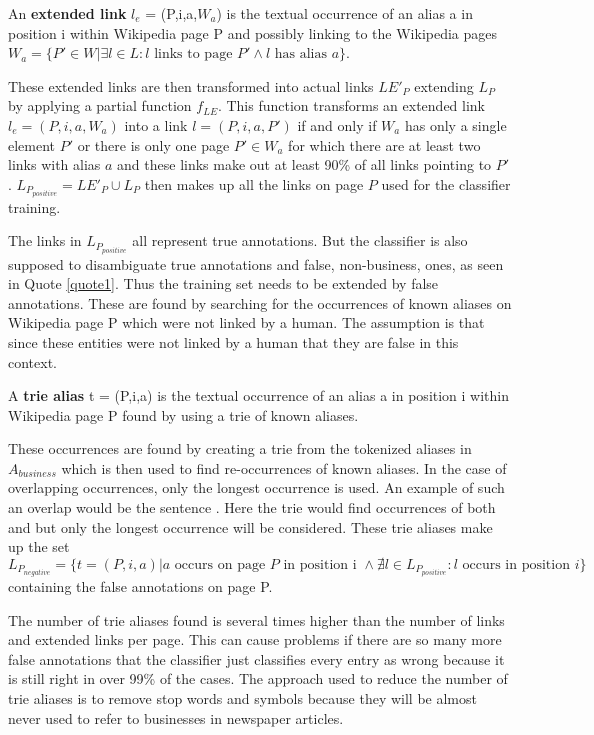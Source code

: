 \begin{definition}
An \textbf{extended link} $l_e$ = (P,i,a,$W_a$) is the textual occurrence of an alias a in position i within Wikipedia page P and possibly linking to the Wikipedia pages $W_a = \{ P' \in W | \exists l \in L: l \text{ links to page } P' \land l \text{ has alias } a \}$.
\label{extendedlink}
\end{definition}
These extended links are then transformed into actual links $LE'_P$ extending $L_P$ by applying a partial function $f_{LE}$.
This function transforms an extended link $l_e = (P,i,a,W_a)$ into a link $l = (P,i,a,P')$ if and only if $W_a$ has only a single element $P'$ or there is only one page $P' \in W_a$ for which there are at least two links with alias $a$ and these links make out at least 90\% of all links pointing to $P'$. $L_{P_{positive}} = LE'_P \cup L_P$ then makes up all the links on page $P$ used for the classifier training.\par
The links in $L_{P_{positive}}$ all represent true annotations. But the classifier is also supposed to disambiguate true annotations and false, non-business, ones, as seen in Quote \ref{quote1}. Thus the training set needs to be extended by false annotations. These are found by searching for the occurrences of known aliases on Wikipedia page P which were not linked by a human. The assumption is that since these entities were not linked by a human that they are false in this context.
\begin{definition}
A \textbf{trie alias} t = (P,i,a) is the textual occurrence of an alias a in position i within Wikipedia page P found by using a trie of known aliases.
\label{triealias}
\end{definition}
These occurrences are found by creating a trie from the tokenized aliases in $A_{business}$ which is then used to find re-occurrences of known aliases. In the case of overlapping occurrences, only the longest occurrence is used. An example of such an overlap would be the sentence . Here the trie would find occurrences of both  and  but only the longest occurrence will be considered. These trie aliases make up the set $L_{P_{negative}} = \{ t = (P,i,a) | a \text{ occurs on page } P \text{ in position i } \land \nexists l \in L_{P_{positive}}: l \text{ occurs in position } i \}$ containing the false annotations on page P.\par
The number of trie aliases found is several times higher than the number of links and extended links per page. This can cause problems if there are so many more false annotations that the classifier just classifies every entry as wrong because it is still right in over 99\% of the cases. The approach used to reduce the number of trie aliases is to remove stop words and symbols because they will be almost never used to refer to businesses in newspaper articles.\par

